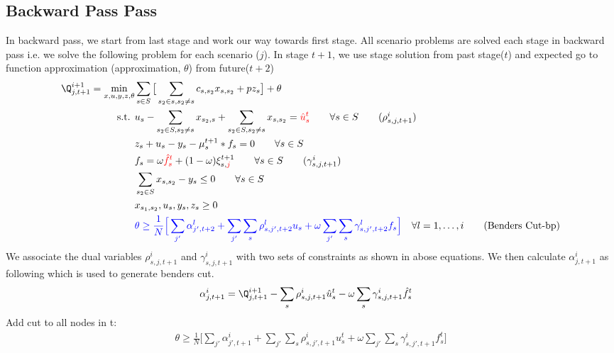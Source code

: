 \documentclass[11pt,letterpaper]{article}
\begin{document}
\subsection*{Backward Pass Pass}
In backward pass, we start from last stage and work our way towards first stage. All scenario problems are solved each stage in backward pass i.e. we solve the following problem for each scenario ($j$).
In stage $t+1$, we use stage solution from past stage($t$) and expected go to function approximation (approximation, $\theta$) from future($t+2$)
\begin{align}
    \Q^{i+1}_{j,t+1}=\min_{x,u,y,z,\theta} & \sum_{s\in S}\big[\sum_{s_2 \in s, s_2\neq s} c_{s,s_2}x_{s,s_2}+pz_{s}\big]+\theta\\
    \text{s.t. } & u_s-\sum_{s_2\in S,s_2\neq s}x_{s_2,s}+\sum_{s_2\in S, s_2\neq s}x_{s,s_2}=\textcolor{red}{{\hat{u}}_s^{t}} \qquad \forall s \in S \tag{$\rho^i_{s,j,t+1}$}\\
    & z_s+u_s-y_s-\mu^{t+1}_s*f_s=0 \qquad \forall s \in S \\
    &f_s=\omega \textcolor{red}{\hat{f}^{t}_s}+(1-\omega)\xi^{t+1}_{s,\textcolor{red}{j}} \qquad \forall s\in S \tag{$\gamma^i_{s,j,t+1}$}\\
    & \sum_{s_2\in S}x_{s,s_2}- y_{s}\le 0 \qquad \forall s \in S \\
    & x_{s_1,s_2}, u_s,y_s,z_s\ge 0\\
    & \textcolor{blue}{\theta\ge \frac1N \Big[\sum_{j'}\alpha^l_{j',t+2}+\sum_{j'}\sum_s\rho^l_{s,j',t+2}{u}_s +\omega\sum_{j'}\sum_s\gamma^l_{s,j',t+2}{f}_s\Big]} \quad \forall l=1,\dots,i \tag{Benders Cut-bp}
\end{align}
We associate the dual variables $\rho^i_{s,j,t+1}$ and $\gamma^i_{s,j,t+1}$ with two sets of constraints as shown in abose equations.
We then calculate $\alpha^i_{j,t+1}$ as following which is used to generate benders cut.
\begin{align}
    &\alpha^i_{j,t+1}=\Q^{i+1}_{j,t+1}-\sum_s\rho^i_{s,j,t+1}{\hat{u}}^t_s-\omega\sum_s\gamma^i_{s,j,t+1}{\hat{f}}^t_s
\end{align}
Add cut to all nodes in t:
\begin{align}
    \theta \ge \frac1N \Big[\sum_{j'}\alpha^i_{j',t+1}+\sum_{j'}\sum_s\rho^i_{s,j',t+1}{u}^t_s+\omega\sum_{j'}\sum_s\gamma^i_{s,j',t+1}{f}^t_s \Big]
\end{align}
\end{document}
